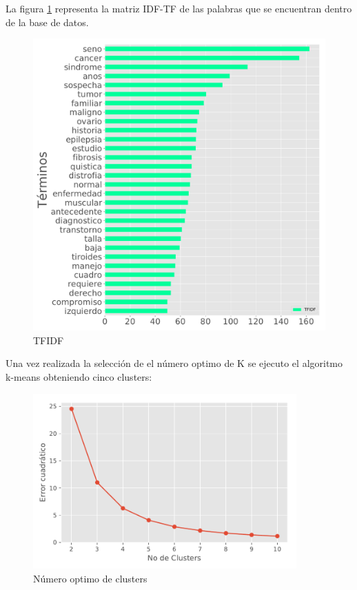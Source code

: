 La figura \ref{fig:IDFTF} representa la matriz IDF-TF de las palabras que se encuentran dentro de la base de datos.  

\begin{figure}[] 
	\centering
	\includegraphics[width=1\textwidth]{Kap4/TFIDF1}
	\caption{TFIDF} 
	\label{fig:IDFTF}
\end{figure}

Una vez realizada la selección de el número optimo de K se ejecuto el algoritmo k-means obteniendo cinco clusters:

\begin{figure}[H] 
	\centering
	\includegraphics[width=0.9\textwidth]{Kap4/Clusters}
	\caption{Número optimo de clusters} 
	\label{fig:Clusters}
\end{figure}

